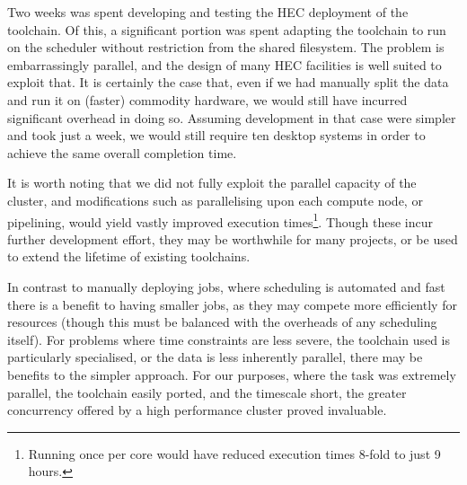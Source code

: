 
Two weeks was spent developing and testing the HEC deployment of the toolchain.  Of this, a significant portion was spent adapting the toolchain to run on the scheduler without restriction from the shared filesystem.
The problem is embarrassingly parallel, and the design of many HEC facilities is well suited to exploit that.  It is certainly the case that, even if we had manually split the data and run it on (faster) commodity hardware, we would still have incurred significant overhead in doing so.  Assuming development in that case were simpler and took just a week, we would still require ten desktop systems in order to achieve the same overall completion time.  

It is worth noting that we did not fully exploit the parallel capacity of the cluster, and modifications such as parallelising upon each compute node, or pipelining, would yield vastly improved execution times\footnote{Running once per core would have reduced execution times 8-fold to just 9 hours.}.
Though these incur further development effort, they may be worthwhile for many projects, or be used to extend the lifetime of existing toolchains.

In contrast to manually deploying jobs, where scheduling is automated and fast there is a benefit to having smaller jobs, as they may compete more efficiently for resources (though this must be balanced with the overheads of any scheduling itself).
For problems where time constraints are less severe, the toolchain used is particularly specialised, or the data is less inherently parallel, there may be benefits to the simpler approach.  For our purposes, where the task was extremely parallel, the toolchain easily ported, and the timescale short, the greater concurrency offered by a high performance cluster proved invaluable.  

